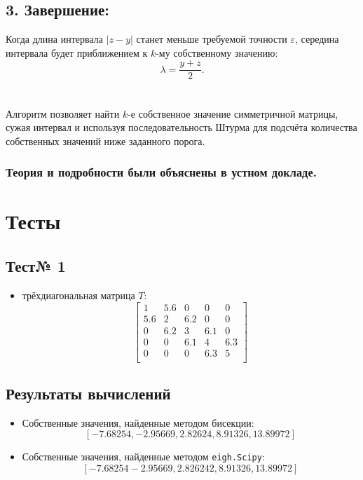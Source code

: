 \documentclass{article}
\begin{document}
\subsection*{3. Завершение:}
Когда длина интервала $|z - y|$ станет меньше требуемой точности $\varepsilon$, середина интервала будет приближением к $k$-му собственному значению:
\[
\lambda = \frac{y + z}{2}.
\]

\section*{}
Алгоритм позволяет найти $k$-е собственное значение симметричной матрицы, сужая интервал и используя последовательность Штурма для подсчёта количества собственных значений ниже заданного порога. 
\subsubsection*{Теория и подробности были объяснены в устном докладе.}
\section*{Тесты}
\subsection*{Тест№ 1}
\begin{itemize}
    \item трёхдиагональная матрица $T$:
    \[
    \begin{bmatrix}
    1 & 5.6 & 0 & 0 & 0 \\
    5.6 & 2 & 6.2 & 0 & 0 \\
    0 & 6.2 & 3 & 6.1 & 0 \\
    0 & 0 & 6.1 & 4 & 6.3 \\
    0 & 0 & 0 & 6.3 & 5 \\
    \end{bmatrix}
    \]
    
\end{itemize}

\subsection*{Результаты вычислений}
\begin{itemize}
    \item Собственные значения, найденные методом бисекции:
    \[
    [-7.68254, -2.95669, 2.82624, 8.91326, 13.89972]
    \]
    \item Собственные значения, найденные методом \texttt{eigh.Scipy}:
    \[
    [-7.68254 -2.95669, 2.826242, 8.91326, 13.89972]
    \]
\end{itemize}
\end{document}
